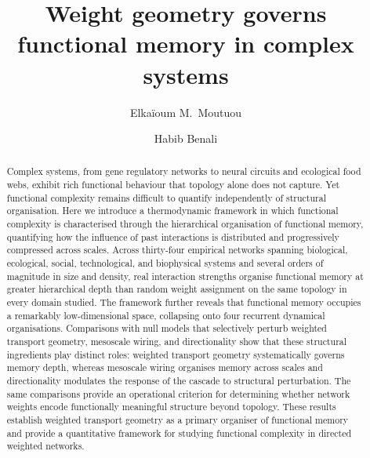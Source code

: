 \documentclass[aps,superscriptaddress,11pt]{revtex4-2}
\theoremstyle{definition}
\theoremstyle{plain}
\begin{document}
\title{Weight geometry governs functional memory in complex systems}

\author{Elka\"ioum M.~Moutuou}

\author{Habib Benali}


\begin{abstract}
Complex systems, from gene regulatory networks to neural circuits and
ecological food webs, exhibit rich functional behaviour that topology
alone does not capture. Yet functional complexity remains difficult to
quantify independently of structural organisation. Here we introduce a
thermodynamic framework in which functional complexity is characterised through
the hierarchical organisation of functional memory, quantifying how the
influence of past interactions is distributed and progressively compressed
across scales. Across thirty-four empirical networks spanning biological,
ecological, social, technological, and biophysical systems and several
orders of magnitude in size and density, real interaction strengths
organise functional memory at greater hierarchical depth than random
weight assignment on the same topology in every domain studied. The
framework further reveals that functional memory occupies a remarkably
low-dimensional space, collapsing onto four recurrent dynamical
organisations. Comparisons with null models that selectively perturb
weighted transport geometry, mesoscale wiring, and directionality show
that these structural ingredients play distinct roles: weighted transport
geometry systematically governs memory depth, whereas mesoscale wiring  
organises memory across scales and directionality modulates the response of 
the cascade to structural perturbation. The same comparisons provide an operational 
criterion for determining whether network weights encode functionally meaningful
structure beyond topology. These results establish weighted transport
geometry as a primary organiser of functional memory and provide a quantitative framework for 
studying functional complexity in directed weighted networks.
\end{abstract}

\maketitle
\end{document}
